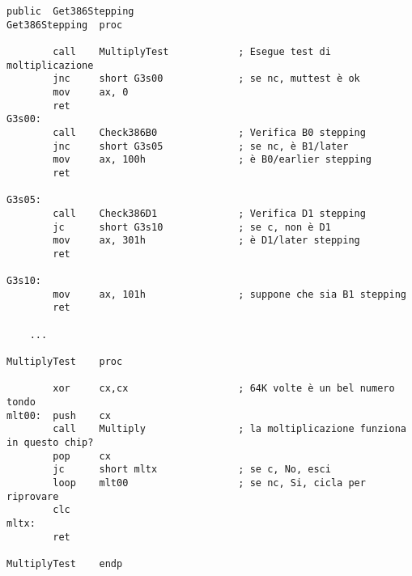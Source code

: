 \begin{lstlisting}[style=customasmx86]
        public  Get386Stepping
Get386Stepping  proc

        call    MultiplyTest            ; Esegue test di moltiplicazione
        jnc     short G3s00             ; se nc, muttest è ok
        mov     ax, 0
        ret
G3s00:
        call    Check386B0              ; Verifica B0 stepping
        jnc     short G3s05             ; se nc, è B1/later
        mov     ax, 100h                ; è B0/earlier stepping
        ret

G3s05:
        call    Check386D1              ; Verifica D1 stepping
        jc      short G3s10             ; se c, non è D1
        mov     ax, 301h                ; è D1/later stepping
        ret

G3s10:
        mov     ax, 101h                ; suppone che sia B1 stepping
        ret

	...

MultiplyTest    proc

        xor     cx,cx                   ; 64K volte è un bel numero tondo
mlt00:  push    cx
        call    Multiply                ; la moltiplicazione funziona in questo chip?
        pop     cx
        jc      short mltx              ; se c, No, esci
        loop    mlt00                   ; se nc, Si, cicla per riprovare
        clc
mltx:
        ret

MultiplyTest    endp
\end{lstlisting}
